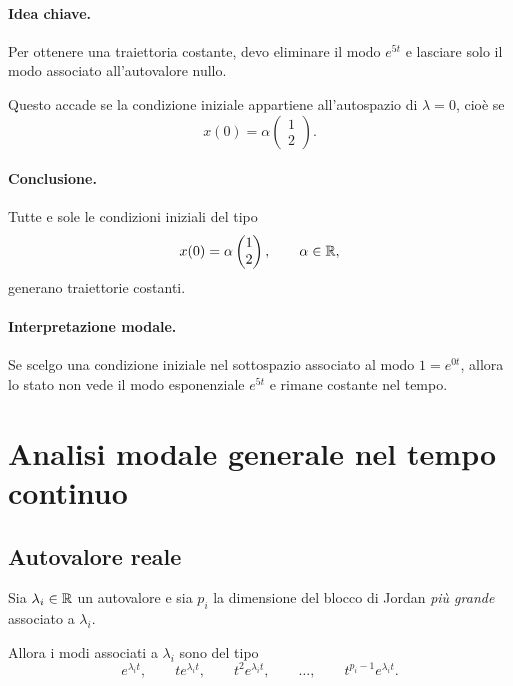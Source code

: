 \paragraph{Idea chiave.}
Per ottenere una traiettoria costante, devo eliminare il modo $e^{5t}$ e lasciare solo il modo associato all'autovalore nullo.

Questo accade se la condizione iniziale appartiene all'autospazio di $\lambda=0$, cioè se
\[
x(0)=\alpha
\begin{pmatrix}
1\\
2
\end{pmatrix}.
\]

\paragraph{Conclusione.}
Tutte e sole le condizioni iniziali del tipo
\begin{equation}
x(0)=\alpha
\begin{pmatrix}
1\\
2
\end{pmatrix},
\qquad \alpha\in\mathbb{R},
\label{eq:L9_constant_traj}
\end{equation}
generano traiettorie costanti.

\paragraph{Interpretazione modale.}
Se scelgo una condizione iniziale nel sottospazio associato al modo $1=e^{0t}$, allora lo stato non vede il modo esponenziale $e^{5t}$ e rimane costante nel tempo.

\section{Analisi modale generale nel tempo continuo}

\subsection{Autovalore reale}

Sia $\lambda_i \in \mathbb{R}$ un autovalore e sia $p_i$ la dimensione del blocco di Jordan \emph{più grande} associato a $\lambda_i$.

Allora i modi associati a $\lambda_i$ sono del tipo
\begin{equation}
e^{\lambda_i t},\qquad
t e^{\lambda_i t},\qquad
t^2 e^{\lambda_i t},\qquad
\dots,\qquad
t^{p_i-1} e^{\lambda_i t}.
\label{eq:L9_modes_real_CT}
\end{equation}


